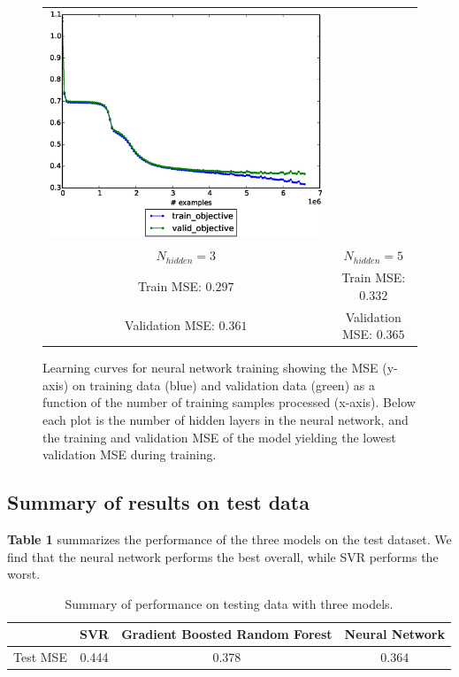 \documentclass[12pt] {article}
\renewcommand{\baselinestretch}{1.3} %
\begin{document}
\begin{figure}[h!]
\begin{tabular}{cc}
\includegraphics[trim = 0mm 20mm 0mm 10mm, clip=true, width=.45\textwidth]{figdir/nn_mse_5.eps} \\
$N_{hidden}=3$ & $N_{hidden}=5$ \\
Train MSE: $0.297$ & Train MSE: $0.332$ \\
Validation MSE: $0.361$ & Validation MSE: $0.365$ \\
\end{tabular}
\caption{Learning curves for neural network training showing the MSE (y-axis) on training data (blue) and validation data (green) as a function of the number of training samples processed (x-axis). Below each plot is the number of hidden layers in the neural network, and the training and validation MSE of the model yielding the lowest validation MSE during training.}
\end{figure}
\renewcommand{\baselinestretch}{1.3} %

\subsection{Summary of results on test data}
\textbf{Table 1} summarizes the performance of the three models on the test dataset. We find that the neural network performs the best overall, while SVR performs the worst.
\begin{table}\centering
\begin{tabular}{cccc}
& SVR & Gradient Boosted Random Forest & Neural Network \\
\hline
Test MSE & 0.444 & 0.378 & 0.364
\end{tabular}
\caption{Summary of performance on testing data with three models.}
\end{table}
\end{document}
